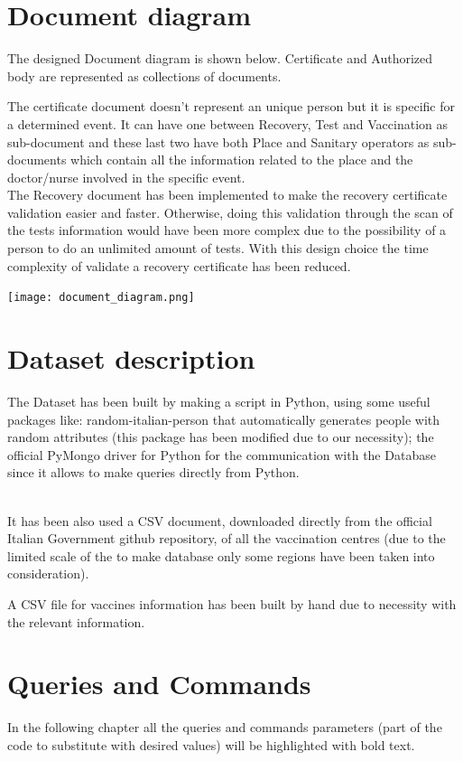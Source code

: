 \documentclass{article}
\begin{document}
\section{Document diagram}
The designed Document diagram is shown below. Certificate and Authorized body are represented as collections of documents.

The certificate document doesn't represent an unique person but it is specific for a determined event. It can have one between Recovery, Test and Vaccination as sub-document and these last two have both Place and Sanitary operators as sub-documents which contain all the information related to the place and the doctor/nurse involved in the specific event.
\hfill\break
\\
The Recovery document has been implemented to make the recovery certificate validation easier and faster. Otherwise, doing this validation through the scan of the tests information would have been more complex due to the possibility of a person to do an unlimited amount of tests.
With this design choice the time complexity of validate a recovery certificate has been reduced.


\begin{center}
\texttt{[image: document\_diagram.png]}
\end{center}


\newpage

\section{Dataset description}
The Dataset has been built by making a script in Python, using some useful packages like: random-italian-person that automatically generates people with random attributes (this package has been modified due to our necessity); the official PyMongo driver for Python for the communication with the Database since it allows to make queries directly from Python.

\\
\hfill\break
It has been also used a CSV document, downloaded directly from the official Italian Government github repository, of all the vaccination centres (due to the limited scale of the to make database only some regions have been taken into consideration).

A CSV file for vaccines information has been built by hand due to necessity with the relevant information.


\newpage
\section{Queries and Commands}
In the following chapter all the queries and commands parameters (part of the code to substitute with desired values) will be highlighted with \textbf{\color{magenta}{magenta}} bold text.
\end{document}
